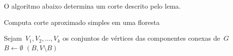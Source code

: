 \bigskip


O algoritmo abaixo determina um corte descrito pelo lema.

\medskip
\medskip

\begin{algorithm}[H]
\label{alg:simpleApproxCutForest}

	\caption{Computa corte aproximado simples em uma floresta}
	Sejam~$V_1, V_2,\ldots, V_k$ os conjuntos de vértices das
	componentes conexas de~$G$\;
	$B \gets \emptyset$\;
	\Return $(B,V\setminus B)$\;

\end{algorithm}	

\bigskip



